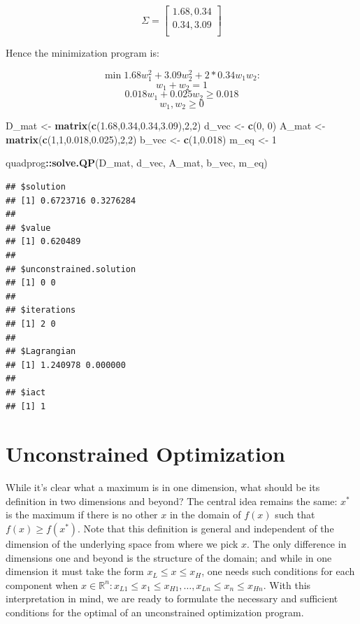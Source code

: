 \documentclass[11pt,]{article}
\newenvironment{Shaded}{\begin{snugshade}}{\end{snugshade}}
\newcommand{\KeywordTok}[1]{\textcolor[rgb]{0.13,0.29,0.53}{\textbf{#1}}}
\newcommand{\DecValTok}[1]{\textcolor[rgb]{0.00,0.00,0.81}{#1}}
\newcommand{\FloatTok}[1]{\textcolor[rgb]{0.00,0.00,0.81}{#1}}
\newcommand{\StringTok}[1]{\textcolor[rgb]{0.31,0.60,0.02}{#1}}
\newcommand{\OperatorTok}[1]{\textcolor[rgb]{0.81,0.36,0.00}{\textbf{#1}}}
\newcommand{\NormalTok}[1]{#1}
\begin{document}
\[\Sigma = 
\begin{bmatrix}
1.68, 0.34\\
0.34, 3.09\\
\end{bmatrix}
\]

Hence the minimization program is:

\[\min{} 1.68w_1^2+3.09w_2^2+2*0.34w_1w_2:\] \[w_1+w_2=1\]
\[0.018w_1 + 0.025w_2 \geq 0.018\] \[w_1, w_2\geq 0\]

\begin{Shaded}
\begin{Highlighting}[]
\NormalTok{D_mat <-}\StringTok{ }\KeywordTok{matrix}\NormalTok{(}\KeywordTok{c}\NormalTok{(}\FloatTok{1.68}\NormalTok{,}\FloatTok{0.34}\NormalTok{,}\FloatTok{0.34}\NormalTok{,}\FloatTok{3.09}\NormalTok{),}\DecValTok{2}\NormalTok{,}\DecValTok{2}\NormalTok{)}
\NormalTok{d_vec <-}\StringTok{ }\KeywordTok{c}\NormalTok{(}\DecValTok{0}\NormalTok{, }\DecValTok{0}\NormalTok{)}
\NormalTok{A_mat <-}\StringTok{ }\KeywordTok{matrix}\NormalTok{(}\KeywordTok{c}\NormalTok{(}\DecValTok{1}\NormalTok{,}\DecValTok{1}\NormalTok{,}\FloatTok{0.018}\NormalTok{,}\FloatTok{0.025}\NormalTok{),}\DecValTok{2}\NormalTok{,}\DecValTok{2}\NormalTok{)}
\NormalTok{b_vec <-}\StringTok{ }\KeywordTok{c}\NormalTok{(}\DecValTok{1}\NormalTok{,}\FloatTok{0.018}\NormalTok{)}
\NormalTok{m_eq <-}\StringTok{ }\DecValTok{1}

\NormalTok{quadprog}\OperatorTok{::}\KeywordTok{solve.QP}\NormalTok{(D_mat, d_vec, A_mat, b_vec, m_eq)}
\end{Highlighting}
\end{Shaded}

\begin{verbatim}
## $solution
## [1] 0.6723716 0.3276284
## 
## $value
## [1] 0.620489
## 
## $unconstrained.solution
## [1] 0 0
## 
## $iterations
## [1] 2 0
## 
## $Lagrangian
## [1] 1.240978 0.000000
## 
## $iact
## [1] 1
\end{verbatim}

\section{Unconstrained Optimization}\label{unconstrained-optimization}

While it's clear what a maximum is in one dimension, what should be its
definition in two dimensions and beyond? The central idea remains the
same: \(x^*\) is the maximum if there is no other \(x\) in the domain of
\(f(x)\) such that \(f(x)\geq f(x^*)\). Note that this definition is
general and independent of the dimension of the underlying space from
where we pick \(x\). The only difference in dimensions one and beyond is
the structure of the domain; and while in one dimension it must take the
form \(x_L\leq x\leq x_H\), one needs such conditions for each component
when
\(x\in \mathbb{R}^n: x_{L1}\leq x_1\leq x_{H1}, \hdots, x_{Ln}\leq x_n\leq x_{Hn}\).
With this interpretation in mind, we are ready to formulate the
necessary and sufficient conditions for the optimal of an unconstrained
optimization program.
\end{document}
